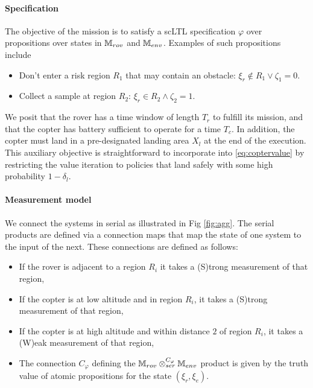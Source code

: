 \documentclass[draft,conference]{IEEEtran}
\begin{document}
\paragraph{Specification}

The objective of the mission is to satisfy a scLTL specification $\varphi$ over propositions over states in $\mathbb{M}_{rov}$ and $\mathbb{M}_{env}$. Examples of such propositions include
\begin{itemize}
  \item Don't enter a risk region $R_1$ that may contain an obstacle: $\xi_r \not  \in R_1 \lor \zeta_1 = 0$.
  \item Collect a sample at region $R_2$: $\xi_r \in R_2 \land \zeta_2 = 1$.
\end{itemize}

We posit that the rover has a time window of length $T_r$ to fulfill its mission, and that the copter has battery sufficient to operate for a time $T_c$. In addition, the copter must land in a pre-designated landing area $X_l$ at the end of the execution. This auxiliary objective is straightforward to incorporate into \eqref{eq:coptervalue} by restricting the value iteration to policies that land safely with some high probability $1-\delta_l$.

\paragraph{Measurement model}

We connect the systems in serial as illustrated in Fig \ref{fig:agg}. The serial products are defined via a connection maps that map the state of one system to the input of the next. These connections are defined as follows:
\begin{itemize}
  \item If the rover is adjacent to a region $R_i$ it takes a (S)trong measurement of that region,
  \item If the copter is at low altitude and in region $R_i$, it takes a (S)trong measurement of that region,
  \item If the copter is at high altitude and within distance $2$ of region $R_i$, it takes a (W)eak measurement of that region,
  \item The connection $C_\varphi$ defining the $\mathbb{M}_{rov} \otimes_{ser}^{C_\varphi} \mathbb{M}_{env}$ product is given by the truth value of atomic propositions for the state $(\xi_r, \xi_e)$.
\end{itemize}
\end{document}
